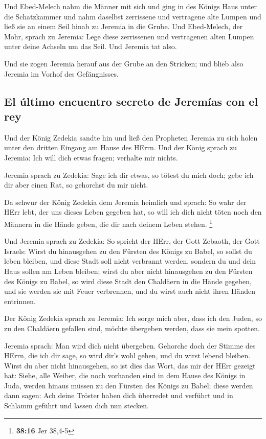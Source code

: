  Und Ebed-Melech nahm die Männer mit sich und ging in des
Königs Haus unter die Schatzkammer und nahm daselbst zerrissene und
vertragene alte Lumpen und ließ sie an einem Seil hinab zu Jeremia in
die Grube.  Und Ebed-Melech, der Mohr, sprach zu Jeremia:
Lege diese zerrissenen und vertragenen alten Lumpen unter deine Achseln
um das Seil. Und Jeremia tat also.

 Und sie zogen Jeremia herauf aus der Grube an den
Stricken; und blieb also Jeremia im Vorhof des Gefängnisses.

\hypertarget{el-uxfaltimo-encuentro-secreto-de-jeremuxedas-con-el-rey}{%
\subsection{El último encuentro secreto de Jeremías con el
rey}\label{el-uxfaltimo-encuentro-secreto-de-jeremuxedas-con-el-rey}}

 Und der König Zedekia sandte hin und ließ den Propheten
Jeremia zu sich holen unter den dritten Eingang am Hause des HErrn. Und
der König sprach zu Jeremia: Ich will dich etwas fragen; verhalte mir
nichts.

 Jeremia sprach zu Zedekia: Sage ich dir etwas, so tötest
du mich doch; gebe ich dir aber einen Rat, so gehorchst du mir nicht.

 Da schwur der König Zedekia dem Jeremia heimlich und
sprach: So wahr der HErr lebt, der uns dieses Leben gegeben hat, so will
ich dich nicht töten noch den Männern in die Hände geben, die dir nach
deinem Leben stehen. \footnote{\textbf{38:16} Jer 38,4-5}

 Und Jeremia sprach zu Zedekia: So spricht der HErr, der
Gott Zebaoth, der Gott Israels: Wirst du hinausgehen zu den Fürsten des
Königs zu Babel, so sollst du leben bleiben, und diese Stadt soll nicht
verbrannt werden, sondern du und dein Haus sollen am Leben bleiben;
 wirst du aber nicht hinausgehen zu den Fürsten des
Königs zu Babel, so wird diese Stadt den Chaldäern in die Hände gegeben,
und sie werden sie mit Feuer verbrennen, und du wirst auch nicht ihren
Händen entrinnen.

 Der König Zedekia sprach zu Jeremia: Ich sorge mich
aber, dass ich den Juden, so zu den Chaldäern gefallen sind, möchte
übergeben werden, dass sie mein spotten.

 Jeremia sprach: Man wird dich nicht übergeben. Gehorche
doch der Stimme des HErrn, die ich dir sage, so wird dir's wohl gehen,
und du wirst lebend bleiben.  Wirst du aber nicht
hinausgehen, so ist dies das Wort, das mir der HErr gezeigt hat:
 Siehe, alle Weiber, die noch vorhanden sind in dem Hause
des Königs in Juda, werden hinaus müssen zu den Fürsten des Königs zu
Babel; diese werden dann sagen: Ach deine Tröster haben dich überredet
und verführt und in Schlamm geführt und lassen dich nun stecken.

